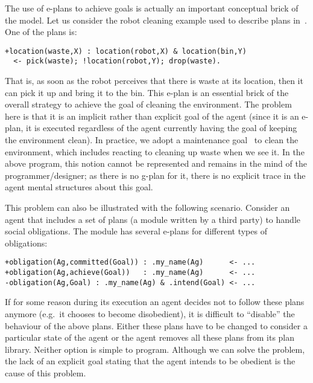 The use of e-plans to achieve goals is actually an important
conceptual brick of the {\asl} model.
%
Let us consider the robot cleaning example used to describe plans
in~\cite{Rao96}. 
%
One of the plans is:

\begin{small}
\begin{verbatim}
+location(waste,X) : location(robot,X) & location(bin,Y)
  <- pick(waste); !location(robot,Y); drop(waste).
\end{verbatim}
\end{small}

\noindent That is, as soon as the robot perceives that there is
waste at its location, then it can pick it up and bring it to the bin.
%
This e-plan is an essential brick of the overall strategy to achieve
the goal of cleaning the environment. The problem here is that it is
an implicit rather than explicit goal of the agent (since it is an e-plan, 
it is executed regardless of the agent currently having the goal of keeping the
environment clean). In practice, we adopt a maintenance
goal~\cite{Duff:2006:PMG:1160633.1160817} to clean the environment,
which includes reacting to cleaning up waste when we see it. In the
above program, this notion cannot be represented and remains in the
mind of the programmer/designer; as there is no g-plan for it, there
is no explicit trace in the agent mental structures about this
goal.

This problem can also be illustrated with the following
scenario. Consider an agent that includes a set of plans (a module
written by a third party) to handle social obligations. The module has
several e-plans for different types of obligations:
\begin{small}
\begin{verbatim}
+obligation(Ag,committed(Goal)) : .my_name(Ag)      <- ...
+obligation(Ag,achieve(Goal))   : .my_name(Ag)      <- ...
-obligation(Ag,Goal) : .my_name(Ag) & .intend(Goal) <- ...
\end{verbatim}
\end{small}
If for some reason during its execution an agent decides not to follow
these plans anymore (e.g.\ it chooses to become disobedient), it is
difficult to ``disable'' the behaviour of the above plans. Either
these plans have to be changed to consider a particular state of the
agent or the agent removes all these plans from its plan
library. Neither option is simple to
program. %
Although we can solve the problem, the lack of an explicit goal
stating that the agent intends to be obedient is the cause of this
problem.

